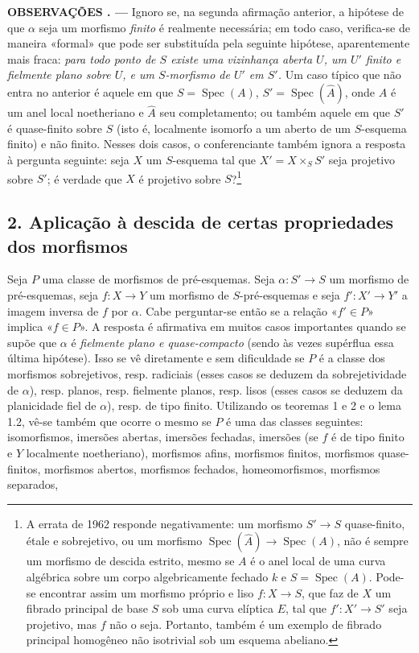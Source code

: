 \documentclass[11pt,twoside,openany]{book}
\numberwithin{equation}{section}
\theoremstyle{plain}
\theoremstyle{definition}
\theoremstyle{remark}
\newcommand{\result}[2]{%
  \par\medskip\noindent\textbf{#1%
  \if\relax\detokenize{#2}\relax\else\space#2\fi. ---}\enspace
}
\begin{document}
\result{OBSERVAÇÕES}{} Ignoro se, na segunda afirmação anterior, a
hipótese de que $\alpha$ seja um morfismo \emph{finito} é realmente necessária;
em todo caso, verifica-se de maneira «formal» que pode ser substituída pela
seguinte hipótese, aparentemente mais fraca: \emph{para todo ponto de $S$
existe uma vizinhança aberta $U$, um $U'$ finito e fielmente plano sobre $U$, e um
$S$-morfismo de $U'$ em $S'$.} Um caso típico que não entra no anterior é
aquele em que $S=\operatorname{Spec}(A)$,
$S'=\operatorname{Spec}(\widehat A)$, onde $A$ é um anel local noetheriano
e $\widehat A$ seu completamento; ou também aquele em que $S'$ é quase-finito sobre
$S$ (isto é, localmente isomorfo a um aberto de um $S$-esquema finito) e não
finito. Nesses dois casos, o conferenciante também ignora a resposta à
pergunta seguinte: seja $X$ um $S$-esquema tal que $X'=X\times_SS'$ seja
projetivo sobre $S'$; é verdade que $X$ é projetivo sobre
$S$?\footnote{A errata de 1962 responde negativamente: um morfismo
$S'\longrightarrow S$ quase-finito, étale e sobrejetivo, ou um morfismo
$\operatorname{Spec}(\widehat A)\longrightarrow\operatorname{Spec}(A)$, não é
sempre um morfismo de descida estrito, mesmo se $A$ é o anel local de
uma curva algébrica sobre um corpo algebricamente fechado $k$ e
$S=\operatorname{Spec}(A)$. Pode-se encontrar assim um morfismo próprio e liso
$f:X\longrightarrow S$, que faz de $X$ um fibrado principal de base $S$ sob
uma curva elíptica $E$, tal que $f':X'\longrightarrow S'$ seja projetivo, mas
$f$ não o seja. Portanto, também é um exemplo de fibrado principal homogêneo
não isotrivial sob um esquema abeliano.}

\subsection*{2. Aplicação à descida de certas propriedades dos morfismos}

Seja $P$ uma classe de morfismos de pré-esquemas. Seja
$\alpha:S'\longrightarrow S$ um morfismo de pré-esquemas, seja
$f:X\longrightarrow Y$ um morfismo de $S$-pré-esquemas e seja
$f':X'\longrightarrow Y'$ a imagem inversa de $f$ por $\alpha$. Cabe
perguntar-se então se a relação «$f'\in P$» implica «$f\in P$». A resposta é
afirmativa em muitos casos importantes quando se supõe que $\alpha$ é
\emph{fielmente plano e quase-compacto} (sendo às vezes supérflua essa última
hipótese). Isso se vê diretamente e sem dificuldade se $P$ é a classe dos
morfismos sobrejetivos, resp. radiciais (esses casos se deduzem da
sobrejetividade de $\alpha$), resp. planos, resp. fielmente planos, resp. lisos
(esses casos se deduzem da planicidade fiel de $\alpha$), resp. de tipo finito.
Utilizando os teoremas 1 e 2 e o lema 1.2, vê-se também que ocorre o mesmo se
$P$ é uma das classes seguintes: isomorfismos, imersões abertas, imersões
fechadas, imersões (se $f$ é de tipo finito e $Y$
localmente noetheriano), morfismos afins, morfismos finitos, morfismos
quase-finitos, morfismos abertos, morfismos fechados, homeomorfismos, morfismos
separados,
\end{document}
